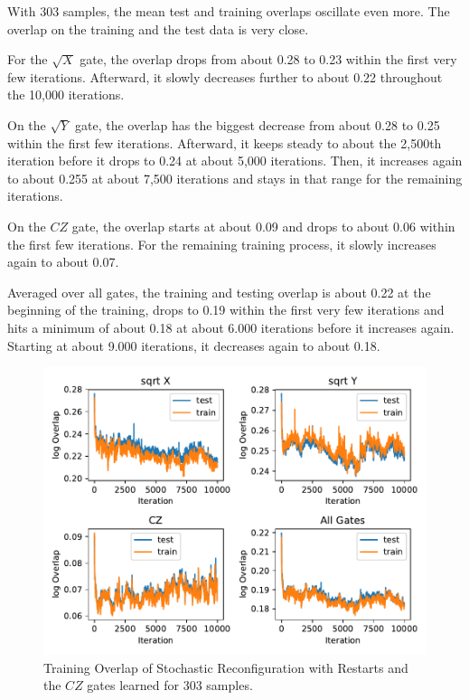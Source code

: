 With 303 samples, the mean test and training overlaps oscillate even more. The overlap on the training and the 
test data is very close. 

For the $\sqrt{X}$ gate, the overlap drops from about 0.28 to 0.23 within the first very few iterations. 
Afterward, it slowly decreases further to about 0.22 throughout the 10,000 iterations.

On the $\sqrt{Y}$ gate, the overlap has the biggest decrease from about 0.28 to 0.25 within the first 
few iterations. Afterward, it keeps steady to about the 2,500th iteration before it drops to 0.24 at about 5,000 iterations.
Then, it increases again to about 0.255 at about 7,500 iterations and stays in that range for the remaining iterations.

On the $CZ$ gate, the overlap starts at about 0.09 and drops to about 0.06 within the first few iterations. 
For the remaining training process, it slowly increases again to about 0.07. 

Averaged over all gates, the training and testing overlap is about 0.22 at the beginning of the training, 
drops to 0.19 within the first very few iterations and hits a minimum of about 0.18 at about 6.000 iterations before 
it increases again. Starting at about 9.000 iterations, it decreases again to about 0.18.

\begin{figure}[H]
  \centering
  \includegraphics[width=\textwidth]{figures/results/SR-restarts-learned/avgOverlap_303.pdf}
  \caption[Training Overlap of Stochastic Reconfiguration with Restarts Learned]{Training 
  Overlap of Stochastic Reconfiguration with Restarts and the $CZ$ gates learned for 303 samples.}
  \label{fig:sr_overlap_303}
\end{figure}

